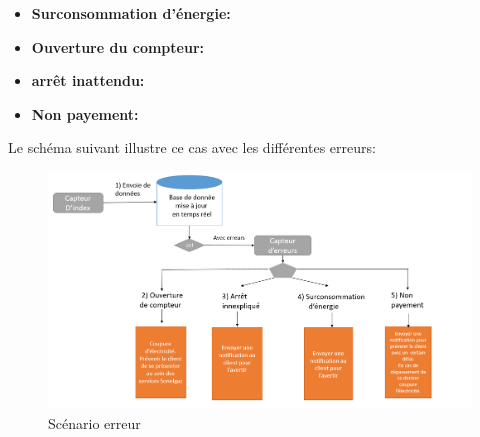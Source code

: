 \begin{itemize}
	\item \textbf{Surconsommation d'énergie:}

	\item \textbf{Ouverture du compteur:}

	\item \textbf{arrêt inattendu:}

	\item \textbf{Non payement:}

\end{itemize}

Le schéma suivant illustre ce cas avec les différentes erreurs:

\begin{figure}[h]
	\centering
	\includegraphics[scale=0.5]{img/part2/2.2.png}
	\caption{Scénario erreur}
\end{figure}
